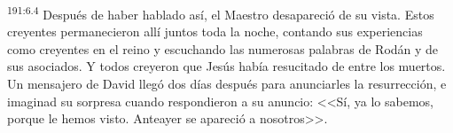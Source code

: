 \par 
\textsuperscript{191:6.4} Después de haber hablado así, el Maestro desapareció de su vista. Estos creyentes permanecieron allí juntos toda la noche, contando sus experiencias como creyentes en el reino y escuchando las numerosas palabras de Rodán y de sus asociados. Y todos creyeron que Jesús había resucitado de entre los muertos. Un mensajero de David llegó dos días después para anunciarles la resurrección, e imaginad su sorpresa cuando respondieron a su anuncio: <<Sí, ya lo sabemos, porque le hemos visto. Anteayer se apareció a nosotros>>.